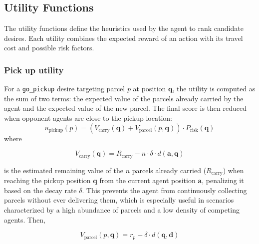 \subsection{Utility Functions}\label{sec:utility_fun}

The utility functions define the heuristics used by the agent to rank candidate
desires. Each utility combines the expected reward of an action with its travel
cost and possible risk factors.

\subsubsection{Pick up utility}\label{sec:pickup_utility}
For a \texttt{go\_pickup} desire targeting parcel $p$ at position $\mathbf{q}$,
the utility is computed as the sum of two terms: the expected value of the
parcels already carried by the agent and the expected value of the new parcel.
The final score is then reduced when opponent agents are close to the pickup
location:
\vspace{-0.3em}
\begin{equation}
u_{\text{pickup}}(p) =
  \left(
    V_{\text{carry}}(\mathbf{q}) + V_{\text{parcel}}(p,\mathbf{q})
  \right)
  \cdot P_{\text{risk}}(\mathbf{q})
\label{eq:pickup_utility}
\end{equation}
\vspace{-0.5em}
where

\vspace{-1.5em}
\begin{equation}
V_{\text{carry}}(\mathbf{q}) =
  R_{\text{carry}} - n \cdot \delta \cdot d(\mathbf{a}, \mathbf{q})
\end{equation}
\vspace{-1em}

is the estimated remaining value of the $n$ parcels already carried ($R_{\text{carry}}$) when reaching
the pickup position $\mathbf{q}$ from the current agent position $\mathbf{a}$, penalizing it based on the decay rate $\delta$. This prevents the agent from continuously collecting parcels without ever delivering them, which is especially useful in scenarios characterized by a high abundance of parcels and a low density of competing agents. Then,


\begin{equation}
V_{\text{parcel}}(p,\mathbf{q}) =
  r_p - \delta \cdot d(\mathbf{q}, \mathbf{d})
\end{equation}
\vspace{-1.5em}

